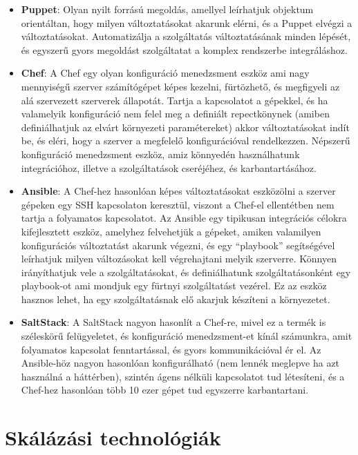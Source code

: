 \documentclass[11pt,magyar,a4paper,oneside,]{report}
\begin{document}
\begin{itemize}
\item
  \textbf{Puppet}\citep{puppet}: Olyan nyilt forrású megoldás, amellyel
  leírhatjuk objektum orientáltan, hogy milyen változtatásokat akarunk
  elérni, és a Puppet elvégzi a változtatásokat. Automatizálja a
  szolgáltatás változtatásának minden lépését, és egyszerű gyors
  megoldást szolgáltatat a komplex rendszerbe integráláshoz.
\item
  \textbf{Chef}\citep{chef}: A Chef egy olyan konfiguráció menedzsment
  eszköz ami nagy mennyiségű szerver számítógépet képes kezelni,
  fürtözhető, és megfigyeli az alá szervezett szerverek állapotát.
  Tartja a kapcsolatot a gépekkel, és ha valamelyik konfiguráció nem
  felel meg a definiált repectkönynek (amiben definiálhatjuk az elvárt
  környezeti paramétereket) akkor változtatásokat indít be, és eléri,
  hogy a szerver a megfelelő konfigurációval rendelkezzen. Népszerű
  konfiguráció menedzsment eszköz, amiz könnyedén használhatunk
  integrációhoz, illetve a szolgáltatások cseréjéhez, és
  karbantartásához.
\item
  \textbf{Ansible}\citep{ansible}: A Chef-hez hasonlóan képes
  változtatásokat eszközölni a szerver gépeken egy SSH kapcsolaton
  keresztül, viszont a Chef-el ellentétben nem tartja a folyamatos
  kapcsolatot. Az Ansible egy tipikusan integrációs célokra
  kifejlesztett eszköz, amelyhez felvehetjük a gépeket, amiken
  valamilyen konfigurációs változtatást akarunk végezni, és egy
  ``playbook'' segítségével leírhatjuk milyen változásokat kell
  végrehajtani melyik szerverre. Könnyen irányíthatjuk vele a
  szolgáltatásokat, és definiálhatunk szolgáltatásonként egy playbook-ot
  ami mondjuk egy fürtnyi szolgáltatást vezérel. Ez az eszköz hasznos
  lehet, ha egy szolgáltatásnak elő akarjuk készíteni a környezetet.
\item
  \textbf{SaltStack}\citep{saltstack}: A SaltStack nagyon hasonlít a
  Chef-re, mivel ez a termék is széleskörű felügyeletet, és konfiguráció
  menedzsment-et kínál számunkra, amit folyamatos kapcsolat
  fenntartással, és gyors kommunikációval ér el. Az Ansible-höz nagyon
  hasonlóan konfigurálható (nem lennék meglepve ha azt használná a
  háttérben), szintén ágens nélküli kapcsolatot tud létesíteni, és a
  Chef-hez hasonlóan több 10 ezer gépet tud egyszerre karbantartani.
\end{itemize}

\section{Skálázási
technológiák}\label{skuxe1luxe1zuxe1si-technoluxf3giuxe1k}
\end{document}

